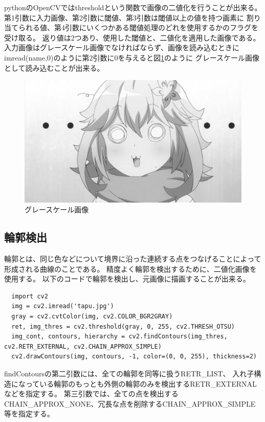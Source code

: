 \documentclass[dvipdfmx]{jsarticle}
\begin{document}
pythonのOpenCVではthresholdという関数で画像の二値化を行うことが出来る。
第1引数に入力画像、第2引数に閾値、第3引数は閾値以上の値を持つ画素に
割り当てられる値、第4引数にいくつかある閾値処理のどれを使用するかのフラグを受け取る。
返り値は2つあり、使用した閾値と、二値化を適用した画像である。
入力画像はグレースケール画像でなければならず、画像を読み込むときに
imread(name,0)のように第2引数に0を与えると図\ref{fig:grayscale}のように
グレースケール画像として読み込むことが出来る。
\begin{figure}[htbp]
  \centering
  \includegraphics[width=0.7\hsize]{../pic/grayscale.png}
  \caption{グレースケール画像}
  \label{fig:grayscale}
\end{figure}

\newpage
\subsection{輪郭検出}

輪郭とは、同じ色などについて境界に沿った連続する点をつなげることによって
形成される曲線のことである。
精度よく輪郭を検出するために、二値化画像を使用する。
以下のコードで輪郭を検出し、元画像に描画することが出来る。
\begin{lstlisting}
  import cv2
  img = cv2.imread('tapu.jpg')
  gray = cv2.cvtColor(img, cv2.COLOR_BGR2GRAY)
  ret, img_thres = cv2.threshold(gray, 0, 255, cv2.THRESH_OTSU)
  img_cont, contours, hierarchy = cv2.findContours(img_thres, cv2.RETR_EXTERNAL, cv2.CHAIN_APPROX_SIMPLE)
  cv2.drawContours(img, contours, -1, color=(0, 0, 255), thickness=2)
\end{lstlisting}

findContoursの第二引数には、全ての輪郭を同等に扱うRETR\_LIST、
入れ子構造になっている輪郭のもっとも外側の輪郭のみを検出するRETR\_EXTERNALなどを指定する。
第三引数では、全ての点を検出するCHAIN\_APPROX\_NONE、冗長な点を削除するCHAIN\_APPROX\_SIMPLE等を指定する。
\end{document}
